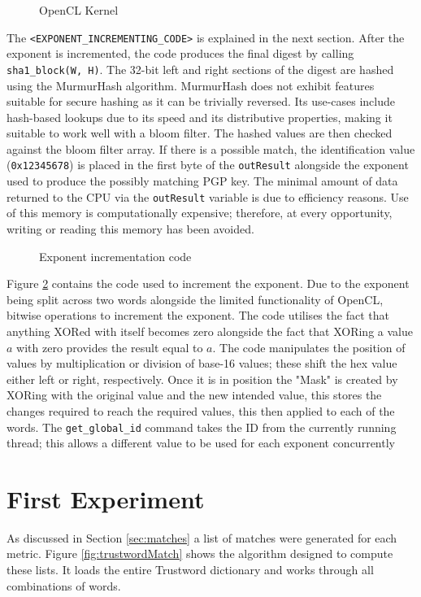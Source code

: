 \begin{figure}[!h]
  \centering
  
  \caption{OpenCL Kernel}
  \label{fig:opencl}
\end{figure}

The \verb|<EXPONENT_INCREMENTING_CODE>| is explained in the next section. After the exponent is incremented, the code produces the final digest by calling \verb|sha1_block(W, H)|. The 32-bit left and right sections of the digest are hashed using the MurmurHash algorithm. MurmurHash does not exhibit features suitable for secure hashing as it can be trivially reversed. Its use-cases include hash-based lookups due to its speed and its distributive properties, making it suitable to work well with a bloom filter. The hashed values are then checked against the bloom filter array. If there is a possible match, the identification value (\verb|0x12345678|) is placed in the first byte of the \verb|outResult| alongside the exponent used to produce the possibly matching PGP key. The minimal amount of data returned to the CPU via the \verb|outResult| variable is due to efficiency reasons. Use of this memory is computationally expensive; therefore, at every opportunity, writing or reading this memory has been avoided.

\begin{figure}[!h]
  \centering
  
  \caption{Exponent incrementation code}
  \label{fig:increment}
\end{figure}

Figure \ref{fig:increment} contains the code used to increment the exponent. Due to the exponent being split across two words alongside the limited functionality of OpenCL, bitwise operations to increment the exponent. The code utilises the fact that anything XORed with itself becomes zero alongside the fact that XORing a value $a$ with zero provides the result equal to $a$. The code manipulates the position of values by multiplication or division  of base-16 values; these shift the hex value either left or right, respectively. Once it is in position the "Mask" is created by XORing with the original value and the new intended value, this stores the changes required to reach the required values, this then applied to each of the words.
The \verb|get_global_id| command takes the ID from the currently running thread; this allows a different value to be used for each exponent concurrently

\newpage

\section{First Experiment}
\label{sec:exp1_implemtation}
As discussed in Section \ref{sec:matches} a list of matches were generated for each metric. Figure \ref{fig:trustwordMatch} shows the algorithm designed to compute these lists. It loads the entire Trustword dictionary and works through all combinations of words.

